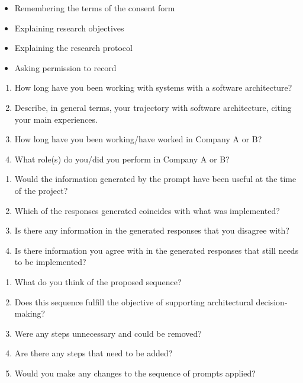
    \begin{itemize}
        \item Remembering the terms of the consent form
        \item Explaining research objectives
        \item Explaining the research protocol
        \item Asking permission to record
    \end{itemize}
    
    \begin{enumerate}
        \item How long have you been working with systems with a software architecture?
        \item Describe, in general terms, your trajectory with software architecture, citing your main experiences.
        \item How long have you been working/have worked in Company A or B?
        \item What role(s) do you/did you perform in Company A or B?
    \end{enumerate}
    

    \begin{enumerate}
        \item Would the information generated by the prompt have been useful at the time of the project?
        \item Which of the responses generated coincides with what was implemented?
        \item Is there any information in the generated responses that you disagree with?
        \item Is there information you agree with in the generated responses that still needs to be implemented?
    \end{enumerate}
    
    \begin{enumerate}
        \item What do you think of the proposed sequence?
        \item Does this sequence fulfill the objective of supporting architectural decision-making?
        \item Were any steps unnecessary and could be removed?
        \item Are there any steps that need to be added?
        \item Would you make any changes to the sequence of prompts applied?
    \end{enumerate}